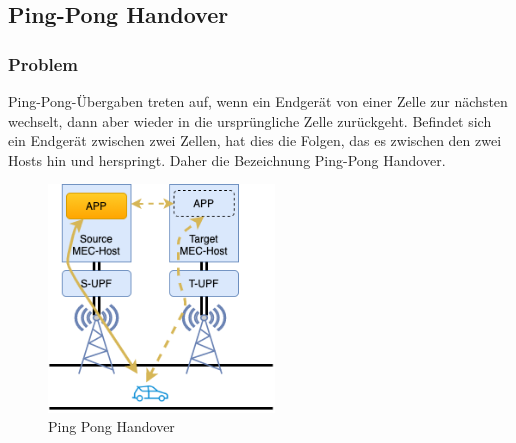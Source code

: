 \documentclass[runningheads]{llncs}
\numberwithin{figure}{section}
\begin{document}
\subsection{Ping-Pong Handover}
\subsubsection{Problem}
Ping-Pong-Übergaben treten auf, wenn ein Endgerät von einer Zelle zur nächsten wechselt, dann aber wieder in die ursprüngliche 
Zelle zurückgeht. Befindet sich ein Endgerät zwischen zwei Zellen, hat dies die Folgen, das es zwischen den zwei Hosts
hin und herspringt. Daher die Bezeichnung Ping-Pong Handover.
\begin{figure}
  \centering
  \includegraphics[width=6cm]{images/pingpong.png}
  \caption{Ping Pong Handover}
  \label{fig:pingpong}
\end{figure}
\end{document}
